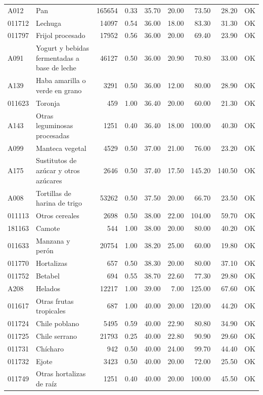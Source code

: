 \begin{table}[ht]
\begin{tabular}{llrrrrrrl}
  A012 & Pan & 165654 & 0.33 & 35.70 & 20.00 & 73.50 & 28.20 & OK \\ 
  011712 & Lechuga & 14097 & 0.54 & 36.00 & 18.00 & 83.30 & 31.30 & OK \\ 
  011797 & Frijol procesado & 17952 & 0.56 & 36.00 & 20.00 & 69.40 & 23.90 & OK \\ 
  A091 & Yogurt y bebidas fermentadas a base de leche & 46127 & 0.50 & 36.00 & 20.90 & 70.80 & 33.00 & OK \\ 
  A139 & Haba amarilla o verde en grano & 3291 & 0.50 & 36.00 & 12.00 & 80.00 & 28.90 & OK \\ 
  011623 & Toronja & 459 & 1.00 & 36.40 & 20.00 & 60.00 & 21.30 & OK \\ 
  A143 & Otras leguminosas procesadas & 1251 & 0.40 & 36.40 & 18.00 & 100.00 & 40.30 & OK \\ 
  A099 & Manteca vegetal & 4529 & 0.50 & 37.00 & 21.00 & 76.00 & 23.20 & OK \\ 
  A175 & Sustitutos de azúcar y otros azúcares & 2646 & 0.50 & 37.40 & 17.50 & 145.20 & 140.50 & OK \\ 
  A008 & Tortillas de harina de trigo & 53262 & 0.50 & 37.50 & 20.00 & 66.70 & 23.50 & OK \\ 
  011113 & Otros cereales & 2698 & 0.50 & 38.00 & 22.00 & 104.00 & 59.70 & OK \\ 
  181163 & Camote & 544 & 1.00 & 38.00 & 20.00 & 80.00 & 40.20 & OK \\ 
  011633 & Manzana y perón & 20754 & 1.00 & 38.20 & 25.00 & 60.00 & 19.80 & OK \\ 
  011770 & Hortalizas & 657 & 0.50 & 38.30 & 20.00 & 80.00 & 37.10 & OK \\ 
  011752 & Betabel & 694 & 0.55 & 38.70 & 22.60 & 77.30 & 29.80 & OK \\ 
  A208 & Helados & 12217 & 1.00 & 39.00 & 7.00 & 125.00 & 67.60 & OK \\ 
  011617 & Otras frutas tropicales & 687 & 1.00 & 40.00 & 20.00 & 120.00 & 44.20 & OK \\ 
  011724 & Chile poblano & 5495 & 0.59 & 40.00 & 22.90 & 80.80 & 34.90 & OK \\ 
  011725 & Chile serrano & 21793 & 0.25 & 40.00 & 22.80 & 90.90 & 29.60 & OK \\ 
  011731 & Chícharo & 942 & 0.50 & 40.00 & 24.00 & 99.70 & 44.40 & OK \\ 
  011732 & Ejote & 3423 & 0.50 & 40.00 & 20.00 & 72.00 & 25.50 & OK \\ 
  011749 & Otras hortalizas de raíz & 1251 & 0.40 & 40.00 & 20.00 & 100.00 & 45.50 & OK \\ 

\end{tabular}
\end{table}
